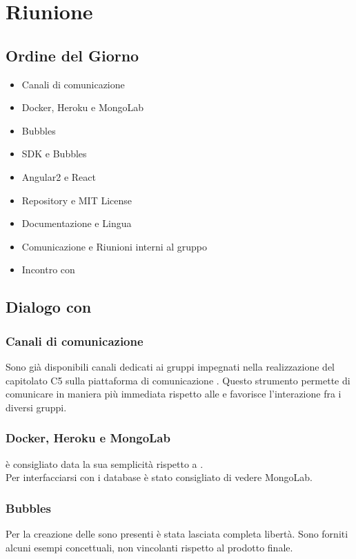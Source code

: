 \section{Riunione}
\subsection{Ordine del Giorno}
\begin{itemize}
	\item Canali di comunicazione
	\item Docker, Heroku e MongoLab
	\item Bubbles
	\item SDK e Bubbles
	\item Angular2 e React
	\item Repository e MIT License
	\item Documentazione e Lingua
	\item Comunicazione e Riunioni interni al gruppo \GroupName{}
	\item Incontro con \Proponente{}	
\end{itemize}

\subsection{Dialogo con \Proponente}
\subsubsection{Canali di comunicazione}
Sono già disponibili canali dedicati ai gruppi impegnati nella realizzazione del capitolato C5 sulla piattaforma di comunicazione . Questo strumento permette di comunicare in maniera più immediata rispetto alle \email{} e favorisce l'interazione fra i diversi gruppi.

\subsubsection{Docker, Heroku e MongoLab}
 è consigliato data la sua semplicità rispetto a .\\ 
Per interfacciarsi con i database è stato consigliato di vedere MongoLab.

\subsubsection{Bubbles}
Per la creazione delle  sono presenti è stata lasciata completa libertà. Sono forniti alcuni esempi concettuali, non vincolanti rispetto al prodotto finale.

